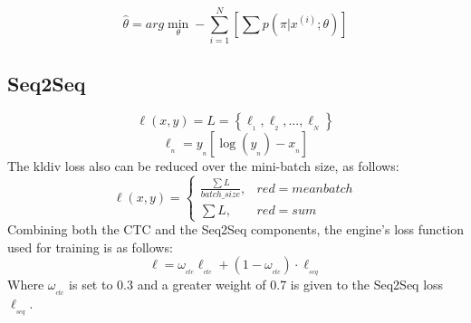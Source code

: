 \begin{equation}
    \hat{\theta} = arg \min_{\theta} - \sum_{i=1}^{N} \left[ \sum p\left( \pi | x^{(i)}; \theta \right) \right]
\end{equation}

\subsection{Seq2Seq}
\begin{equation}
    \ell(x, y) = L = \left\{ \ell_{_{1}}, \ell_{_{2}}, ..., \ell_{_{N}} \right\} 
\end{equation}
\begin{equation}
    \ell_{_{n}} = y_{_{n}} \left[ \log \left( y_{_{n}} \right) - x_{_{n}} \right]
\end{equation}
The kldiv loss also can be reduced over the mini-batch size, as follows:
\begin{equation}
    \ell(x, y) = \begin{cases}
        \frac{\sum {L}}{batch\_size}, & red=meanbatch \\
        \sum {L}, & red=sum
    \end{cases}
\end{equation}
Combining both the CTC and the Seq2Seq components,
the engine's loss function used for training is as follows:
\begin{equation}
    \ell = \omega_{_{ctc}}  \ell_{_{ctc}} + (1 - \omega_{_{ctc}}) \cdot \ell_{_{seq}}
\end{equation}
Where \(\omega_{_{ctc}}\) is set to 0.3 and a greater weight of 0.7 is
given to the Seq2Seq loss \(\ell_{_{seq}}\).





                            

